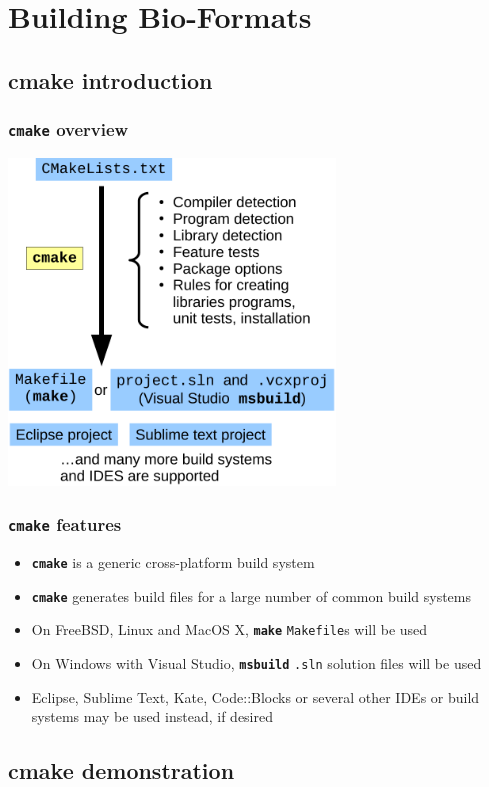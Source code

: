 \documentclass{beamer}
\newcommand{\cmd}[1]{\textbf{\texttt{#1}}}
\begin{document}
\section{Building Bio-Formats}

\subsection{cmake introduction}

\begin{frame}
  \frametitle{\cmd{cmake} overview}
  \medskip
  \centering
  \includegraphics[width=0.65\textwidth]{cmake-flow}
\end{frame}

\begin{frame}
  \frametitle{\cmd{cmake} features}

  \begin{itemize}
  \item \cmd{cmake} is a generic cross-platform build system
  \item \cmd{cmake} generates build files for a large number of common
    build systems
  \item On FreeBSD, Linux and MacOS X, \cmd{make} \texttt{Makefile}s will be used
  \item On Windows with Visual Studio, \cmd{msbuild} \texttt{.sln}
    solution files will be used
  \item Eclipse, Sublime Text, Kate, Code::Blocks or several other
    IDEs or build systems may be used instead, if desired
  \end{itemize}
\end{frame}

\subsection{cmake demonstration}
\end{document}
